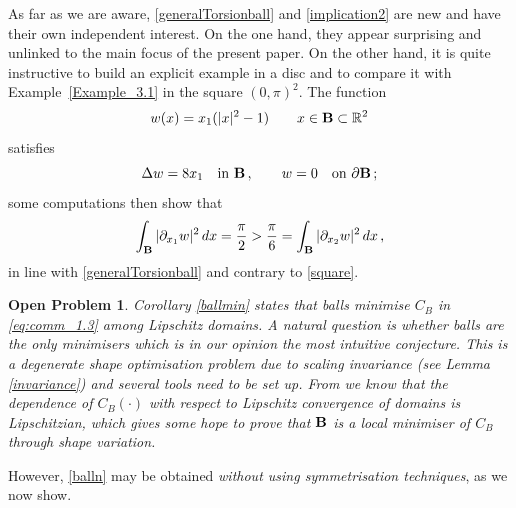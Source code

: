\documentclass[11pt]{article}
\theoremstyle{plain}
\newtheorem{problem}{Open Problem}
\theoremstyle{definition}
\numberwithin{equation}{section}
\newcommand{\R}{\mathbb{R}}
\newcommand{\B}{{\bf B}}
\begin{document}
As far as we are aware, \eqref{generalTorsionball} and \eqref{implication2} are new and have their own independent interest.
On the one hand, they appear surprising and unlinked to the main focus of the present paper. On the other hand, it is
quite instructive to build an explicit example in a disc and to compare it with Example~\ref{Example_3.1} in the square $(0,\pi)^2$. The function
$$w(x)=x_1(|x|^2-1)\qquad x\in\B\subset\R^2$$
satisfies
$$
\Delta w=8x_1\quad\mbox{in }\B\, ,\qquad w=0\quad\mbox{on }\partial\B\, ;
$$
some computations then show that
$$
\int_{\B}|\partial_{x_1}w|^2\, dx=\frac{\pi}{2}>\frac{\pi}{6}=\int_{\B}|\partial_{x_2}w|^2\, dx\, ,
$$
in line with \eqref{generalTorsionball} and contrary to \eqref{square}.

\begin{problem}\label{shapeopt}
Corollary \ref{ballmin} states that balls minimise $C_B$ in \eqref{eq:comm_1.3} among Lipschitz domains. A natural question is whether balls are the only minimisers which is in our opinion the most intuitive conjecture. This is a degenerate shape optimisation
problem due to scaling invariance (see Lemma \ref{invariance}) and several tools need to be set up. From \cite[Theorem 4.4]{Bernardi} we know that the dependence
of $C_B(\cdot)$ with respect to Lipschitz convergence of domains is Lipschitzian, which gives some hope to prove that $\B$ is a {\em local} minimiser of $C_B$ through shape variation.
\end{problem}

 However, \eqref{balln} may be obtained
{\em without using symmetrisation techniques}, as we now show.\par\medskip
\end{document}
